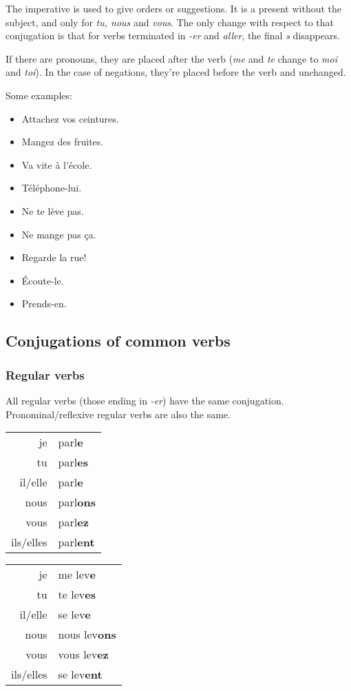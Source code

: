 \documentclass[palatino]{nicenotes}
\newcommand{\conjug}[6]{\begin{tabular}{rl}
je & #1 \\
tu & #2 \\
il/elle & #3 \\
nous & #4 \\
vous & #5 \\
ils/elles & #6 \\
\end{tabular}}
\begin{document}
The imperative is used to give orders or suggestions. It is a present without the subject, and only for \textit{tu, nous} and \textit{vous}. The only change with respect to that conjugation is that for verbs terminated in \textit{-er} and \textit{aller}, the final \textit{s} disappears.

If there are pronouns, they are placed after the verb (\textit{me} and \textit{te} change to \textit{moi} and \textit{toi}). In the case of negations, they're placed before the verb and unchanged.

Some examples:

\begin{multicols}{3}
\begin{itemize}
\item Attachez vos ceintures.
\item Mangez des fruites.
\item Va vite à l'école.
\item Téléphone-lui.
\item Ne te lève pas.
\item Ne mange pas ça.
\item Regarde la rue!
\item Écoute-le.
\item Prends-en.
\end{itemize}
\end{multicols}

\subsection{Conjugations of common verbs}

\subsubsection{Regular verbs}

All regular verbs (those ending in \textit{-er}) have the same conjugation. Pronominal/reflexive regular verbs are also the same.

\begin{minipage}{0.45\textwidth}
\centering
\conjug
	{parl\textbf{e}}
	{parl\textbf{es}}
	{parl\textbf{e}}
	{parl\textbf{ons}}
	{parl\textbf{ez}}
	{parl\textbf{ent}}
\end{minipage}
\begin{minipage}{0.45\textwidth}
\centering
\conjug
	{me lev\textbf{e}}
	{te lev\textbf{es}}
	{se lev\textbf{e}}
	{nous lev\textbf{ons}}
	{vous lev\textbf{ez}}
	{se lev\textbf{ent}}
\end{minipage}
\end{document}
